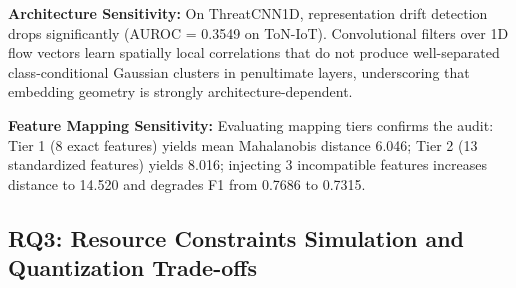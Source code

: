\documentclass[journal]{IEEEtran}
\begin{document}
\textbf{Architecture Sensitivity:}
On ThreatCNN1D, representation drift detection drops significantly (AUROC = 0.3549 on ToN-IoT). Convolutional filters over 1D flow vectors learn spatially local correlations that do not produce well-separated class-conditional Gaussian clusters in penultimate layers, underscoring that embedding geometry is strongly architecture-dependent.

\textbf{Feature Mapping Sensitivity:}
Evaluating mapping tiers confirms the audit: Tier 1 (8 exact features) yields mean Mahalanobis distance 6.046; Tier 2 (13 standardized features) yields 8.016; injecting 3 incompatible features increases distance to 14.520 and degrades F1 from 0.7686 to 0.7315.

\subsection{RQ3: Resource Constraints Simulation and Quantization Trade-offs}
\end{document}
